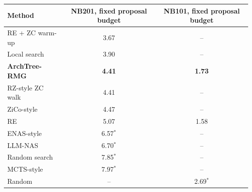\begin{tabular}{@{}lcc@{}}
\toprule
Method & NB201, fixed proposal budget & NB101, fixed proposal budget\\
\midrule
RE + ZC warm-up & 3.67 & --\\
Local search & 3.90 & --\\
\textbf{ArchTree-RMG} & \textbf{4.41} & \textbf{1.73}\\
RZ-style ZC walk & 4.41 & --\\
ZiCo-style & 4.47 & --\\
RE & 5.07 & 1.58\\
ENAS-style & 6.57$^{*}$ & --\\
LLM-NAS & 6.70$^{*}$ & --\\
Random search & 7.85$^{*}$ & --\\
MCTS-style & 7.97$^{*}$ & --\\
Random & -- & 2.69$^{*}$\\
\bottomrule
\end{tabular}
